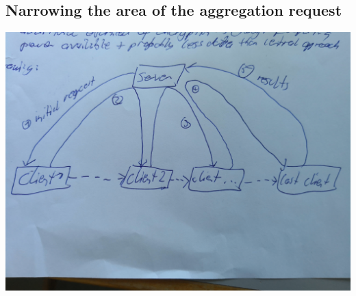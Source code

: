  \subsection{Narrowing the area of the aggregation request}

\includegraphics[width=\textwidth]{data/concept.jpg}


